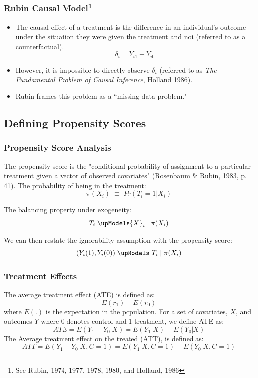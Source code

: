 \documentclass[10pt,slidestop,mathserif,c]{beamer}
\begin{document}
\begin{frame}
    \frametitle{Rubin Causal Model\footnote{See Rubin, 1974, 1977, 1978, 1980, and Holland, 1986}}
    \begin{itemize}
        \item The causal effect of a treatment is the difference in an individual's outcome under the situation they were given the treatment and not (referred to as a counterfactual).
        $${\delta}_{i} ={ Y }_{ i1 }-{ Y }_{ i0 }$$
        \item However, it is impossible to directly observe ${\delta}_{i}$ (referred to as \textit{The Fundamental Problem of Causal Inference}, Holland 1986).
        \item Rubin frames this problem as a ``missing data problem."
    \end{itemize}
\end{frame}



\subsection{Defining Propensity Scores}

	

\begin{frame}
    \frametitle{Propensity Score Analysis}
    The propensity score is the "conditional probability of assignment to a particular treatment given a vector of observed covariates" (Rosenbaum \& Rubin, 1983, p. 41). The probability of being in the treatment:
    $$\pi ({ X }_{ i }) \; \equiv \; Pr({ T }_{ i }=1|{ X }_{ i })$$
    
    The balancing property under exogeneity:
    $${ T }_{ i } \; \upModels { X }_{ i } \;| \; \pi ({ X }_{ i })$$
    
    We can then restate the ignorability assumption with the propensity score: 
    $$({ Y }_{ i }(1),{ Y }_{ i }(0)) \; \upModels \; { T }_{ i } \; | \; \pi({ X }_{ i })$$
\end{frame}
    
\begin{frame}
    \frametitle{Treatment Effects}    
    The average treatment effect (ATE) is defined as:
    $$E({ r }_{ 1 })-E({ r }_{ 0 })$$
    where $E(.)$ is the expectation in the population. For a set of covariates, $X$, and outcomes $Y$ where 0 denotes control and 1 treatment, we define ATE as:
    $$ATE=E(Y_{1}-Y_{0}|X)=E(Y_{1}|X)-E(Y_{0}|X)$$
    The Average treatment effect on the treated (ATT), is defined as:
    $$ATT=E(Y_{1}-Y_{0}|X,C=1)=E(Y_{1}|X,C=1)-E(Y_{0}|X,C=1)$$
\end{frame}
\end{document}
